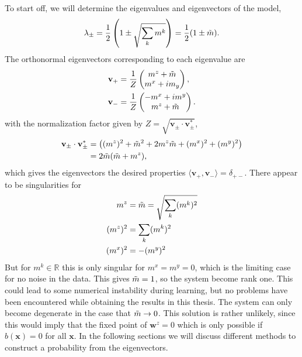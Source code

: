 To start off, we will determine the eigenvalues and eigenvectors of the model,
\begin{align}
    \lambda_{\pm} = \frac{1}{2}\left(1 \pm \sqrt{\sum_k m^k}\right) = \frac{1}{2}(1 \pm \Tilde{m}).
    \label{eq:eigenvalue}
\end{align}
The orthonormal eigenvectors corresponding to each eigenvalue are
\begin{align}
    \mathbf{v}_+ &= \frac{1}{Z}
    \begin{pmatrix}
        m^z + \Tilde{m}\\
        m^x + im_y\\
    \end{pmatrix} \nonumber ,\\
    \mathbf{v}_- &=  \frac{1}{Z}
    \begin{pmatrix}
        -m^x + im^y\\
        m^z + \Tilde{m}
    \end{pmatrix}.
    \label{eq:eigenvector}
\end{align}
with the normalization factor given by $Z = \sqrt{\mathbf{v}_{\pm} \cdot \mathbf{v}_{\pm}^*}$,
\begin{align*}
    \mathbf{v}_\pm \cdot \mathbf{v}^*_\pm &=  \left((m^z)^2 + \Tilde{m}^2 + 2m^z\Tilde{m} + (m^x)^2 + (m^y)^2 \right) \\
    &= 2\Tilde{m}(\Tilde{m} + m^z),
\end{align*}
which gives the eigenvectors the desired properties $\langle\mathbf{v}_+,\mathbf{v}_-\rangle = \delta_{+-}$. There appear to be singularities for  
\begin{align*}
    m^z &= \Tilde{m} = \sqrt{\sum_k (m^k)^2}\\
    (m^z)^2 &= \sum_k (m^k)^2\\
    (m^x)^2 &= -(m^y)^2
\end{align*}
But for $m^k\in \mathbb{R}$ this is only singular for $m^x=m^y=0$, which is the limiting case for no noise in the data. This gives $\Tilde{m}=1$, so the system become rank one. This could lead to some numerical instability during learning, but no problems have been encountered while obtaining the results in this thesis. The system can only become degenerate in the case that $\Tilde{m}\to0$. This solution is rather unlikely, since this would imply that the fixed point of $\mathbf{w}^z=0$ which is only possible if $b(\mathbf{x})=0$ for all $\mathbf{x}$. In the following sections we will discuss different methods to construct a probability from the eigenvectors.

